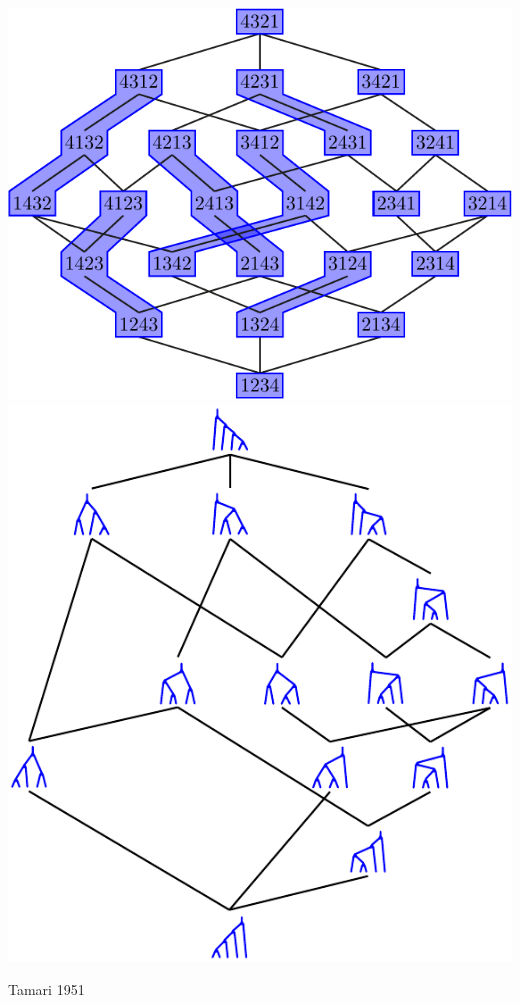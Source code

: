 \documentclass[11pt]{beamer}%
\newcommand{\green}{\color{darkgreen}}
\newcommand{\auth}[1]{{\green\hfill{\footnotesize #1}}}
\begin{document}
\begin{frame}
  \begin{center}
    \includegraphics[height=.55\textheight]{weakOrderCongruence4.pdf}
    \includegraphics[height=.55\textheight]{TamariLattice4.pdf}
  \end{center}
  \auth{Tamari 1951}
\end{frame}
\end{document}
